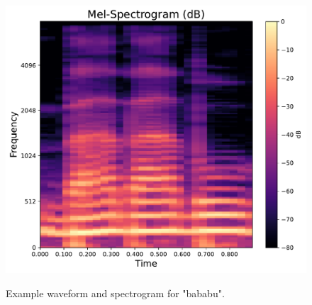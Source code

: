 \begin{figure}[h]
\begin{minipage}[b]{0.3\linewidth}
		\label{fig:linear-spectrogram-db}
	\end{minipage}
	\hfill
	\begin{minipage}[b]{0.3\linewidth}
		\includegraphics[width=\linewidth]{"graphs/sectr_example/Mel-Spectrogram (dB)"}
		\label{fig:mel-spectrogram-db}
	\end{minipage}
	\caption{Example waveform and spectrogram for "bababu".}
	\label{fig:example_mel_bababu}
\end{figure}

